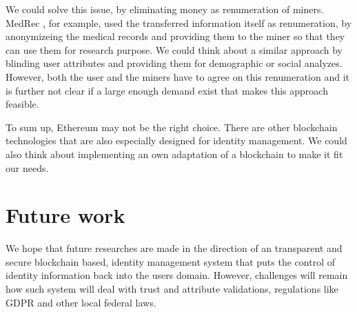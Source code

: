 We could solve this issue, by eliminating money as renumeration of miners. MedRec \cite{azaria2016medrec}, for example, used the transferred information itself as renumeration, by anonymizeing the medical records and providing them to the miner so that they can use them for research purpose. We could think about a similar approach by blinding user attributes and providing them for demographic or social analyzes. However, both the user and the miners have to agree on this renumeration and it is further not clear if a large enough demand exist that makes this approach feasible.

To sum up, Ethereum may not be the right choice. There are other blockchain technologies that are also especially designed for identity management. We could also think about implementing an own adaptation of a blockchain to make it fit our needs. 

\section{Future work}
We hope that future researches are made in the direction of an transparent and secure blockchain based, identity management system that puts the control of identity information back into the users domain. However, challenges will remain how such system will deal with trust and attribute validations, regulations like GDPR and other local federal laws.
